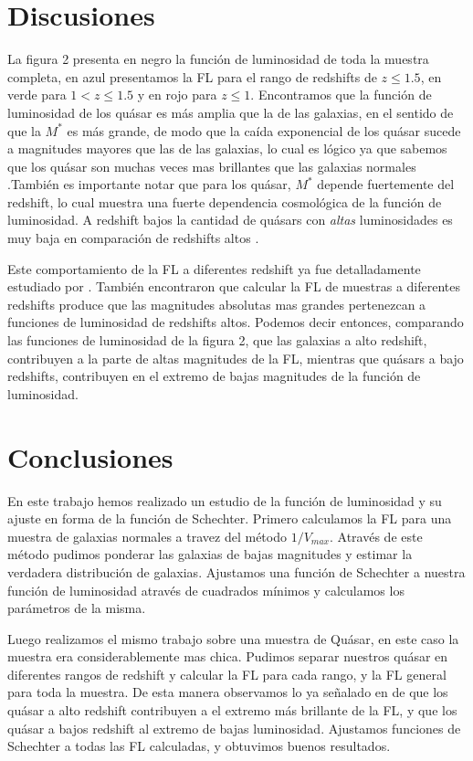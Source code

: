 \documentclass[a4paper,10pt]{article}
\begin{document}
\section{Discusiones}
La figura 2 presenta en negro la funci\'on de luminosidad de toda la muestra completa, en azul presentamos la FL para el rango de redshifts de $z\leq1.5$, en verde para $1<z\leq1.5$ y en rojo para $z\leq1$. 
Encontramos que la funci\'on de luminosidad de los qu\'asar es m\'as amplia que la de las galaxias, en el sentido de que la $M^{\ast}$ es m\'as grande, de modo que la ca\'ida exponencial de los qu\'asar sucede a magnitudes mayores que las de las galaxias, lo cual es l\'ogico ya que sabemos que los qu\'asar son muchas veces mas brillantes que las galaxias normales .Tambi\'en es importante notar que para los qu\'asar, $M^{\ast}$ depende fuertemente del redshift, lo cual muestra una fuerte dependencia cosmol\'ogica de la funci\'on de luminosidad. A redshift bajos la cantidad de qu\'asars con \textit{altas} luminosidades es muy baja en comparaci\'on de redshifts altos \citep{Schneider}.

Este comportamiento de la FL a diferentes redshift ya fue detalladamente estudiado por \cite{Croom2009}. Tambi\'en encontraron que calcular la FL de muestras a diferentes redshifts produce que las magnitudes absolutas mas grandes pertenezcan a funciones de luminosidad de redshifts altos. Podemos decir entonces, comparando las funciones de luminosidad de la figura 2, que las galaxias a alto redshift, contribuyen a la parte de altas magnitudes de la FL, mientras que qu\'asars a bajo redshifts, contribuyen en el extremo de bajas magnitudes de la funci\'on de luminosidad. 

 
\section{Conclusiones}

En este trabajo hemos realizado un estudio de la funci\'on de luminosidad y su ajuste en forma de la funci\'on de Schechter. Primero calculamos la FL para una muestra de galaxias normales a travez del m\'etodo $1/V_{max}$. Atrav\'es de este m\'etodo pudimos ponderar las galaxias de bajas magnitudes y estimar la verdadera distribuci\'on de galaxias. Ajustamos una funci\'on de Schechter a nuestra funci\'on de luminosidad atrav\'es de cuadrados m\'inimos y calculamos los par\'ametros de la misma. 

Luego realizamos el mismo trabajo sobre una muestra de Qu\'asar, en este caso la muestra era considerablemente mas chica. Pudimos separar nuestros qu\'asar en diferentes rangos de redshift y calcular la FL para cada rango, y la FL general para toda la muestra. De esta manera observamos lo ya se\~nalado en \citep{Croom2009} de que los qu\'asar a alto redshift contribuyen a el extremo m\'as brillante de la FL, y que los qu\'asar a bajos redshift al extremo de bajas luminosidad. Ajustamos funciones de Schechter a todas las FL calculadas, y obtuvimos buenos resultados.
\end{document}
